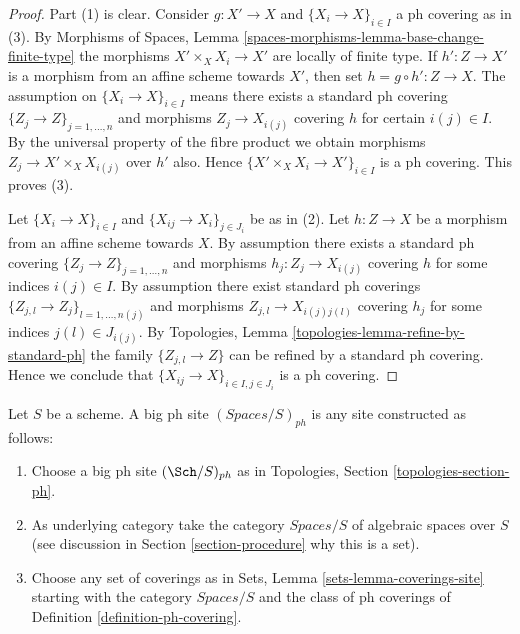 \begin{proof}
Part (1) is clear. Consider $g : X' \to X$ and
$\{X_i \to X\}_{i\in I}$ a ph covering as in (3). By
Morphisms of Spaces, Lemma \ref{spaces-morphisms-lemma-base-change-finite-type}
the morphisms $X' \times_X X_i \to X'$ are locally of finite type.
If $h' : Z \to X'$ is a morphism from an affine scheme
towards $X'$, then set $h = g \circ h' : Z \to X$. The assumption
on $\{X_i \to X\}_{i\in I}$ means there exists a standard ph covering
$\{Z_j \to Z\}_{j = 1, \ldots, n}$ and morphisms $Z_j \to X_{i(j)}$ covering
$h$ for certain $i(j) \in I$. By the universal property of the fibre product
we obtain morphisms $Z_j \to X' \times_X X_{i(j)}$ over $h'$ also.
Hence $\{X' \times_X X_i \to X'\}_{i\in I}$ is a ph covering.
This proves (3).

\medskip\noindent
Let $\{X_i \to X\}_{i\in I}$ and $\{X_{ij} \to X_i\}_{j\in J_i}$ be as
in (2). Let $h : Z \to X$ be a morphism from an affine scheme towards $X$.
By assumption there exists a standard ph covering
$\{Z_j \to Z\}_{j = 1, \ldots, n}$ and morphisms $h_j : Z_j \to X_{i(j)}$
covering $h$ for some indices $i(j) \in I$. By assumption there exist
standard ph coverings
$\{Z_{j, l} \to Z_j\}_{l = 1, \ldots, n(j)}$
and morphisms $Z_{j, l} \to X_{i(j)j(l)}$ covering
$h_j$ for some indices $j(l) \in J_{i(j)}$. By
Topologies, Lemma \ref{topologies-lemma-refine-by-standard-ph}
the family $\{Z_{j, l} \to Z\}$ can be refined by a standard ph covering.
Hence we conclude that $\{X_{ij} \to X\}_{i \in I, j\in J_i}$
is a ph covering.
\end{proof}

\begin{definition}
\label{definition-big-ph-site}
Let $S$ be a scheme. A big ph site {\it $(\textit{Spaces}/S)_{ph}$}
is any site constructed as follows:
\begin{enumerate}
\item Choose a big ph site $(\Sch/S)_{ph}$ as in
Topologies, Section \ref{topologies-section-ph}.
\item As underlying category take the category $\textit{Spaces}/S$
of algebraic spaces over $S$ (see discussion in
Section \ref{section-procedure} why this is a set).
\item Choose any set of coverings as in
Sets, Lemma \ref{sets-lemma-coverings-site} starting with the
category $\textit{Spaces}/S$ and the class of ph coverings
of Definition \ref{definition-ph-covering}.
\end{enumerate}
\end{definition}

